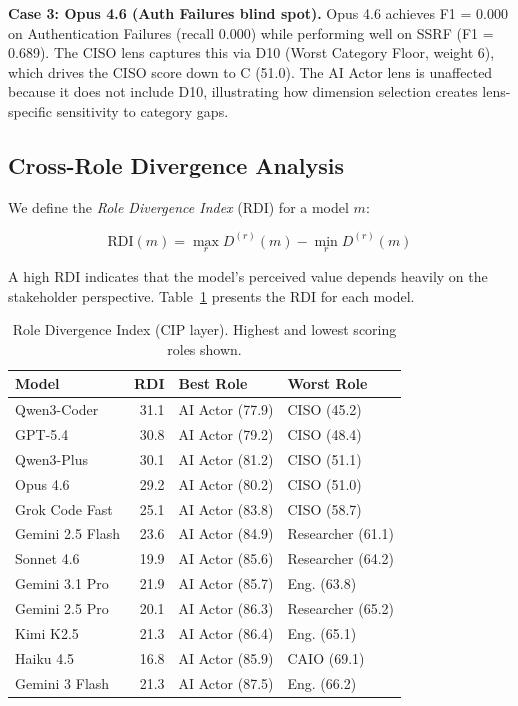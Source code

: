 \documentclass[10pt,twocolumn]{article}
\begin{document}
\textbf{Case 3: Opus 4.6 (Auth Failures blind spot).} Opus 4.6 achieves F1 = 0.000 on Authentication Failures (recall 0.000) while performing well on SSRF (F1 = 0.689). The CISO lens captures this via D10 (Worst Category Floor, weight 6), which drives the CISO score down to C (51.0). The AI Actor lens is unaffected because it does not include D10, illustrating how dimension selection creates lens-specific sensitivity to category gaps.

\subsection{Cross-Role Divergence Analysis}
\label{sec:divergence}

We define the \emph{Role Divergence Index} (RDI) for a model $m$:

\begin{equation}
\text{RDI}(m) = \max_{r} D^{(r)}(m) - \min_{r} D^{(r)}(m)
\label{eq:rdi}
\end{equation}

A high RDI indicates that the model's perceived value depends heavily on the stakeholder perspective. Table~\ref{tab:rdi} presents the RDI for each model.

\begin{table}[t]
\centering
\caption{Role Divergence Index (CIP layer). Highest and lowest scoring roles shown.}
\label{tab:rdi}
\small
\begin{tabular}{@{}l r l l@{}}
\toprule
\textbf{Model} & \textbf{RDI} & \textbf{Best Role} & \textbf{Worst Role} \\
\midrule
Qwen3-Coder      & 31.1 & AI Actor (77.9) & CISO (45.2) \\
GPT-5.4          & 30.8 & AI Actor (79.2) & CISO (48.4) \\
Qwen3-Plus       & 30.1 & AI Actor (81.2) & CISO (51.1) \\
Opus 4.6         & 29.2 & AI Actor (80.2) & CISO (51.0) \\
Grok Code Fast   & 25.1 & AI Actor (83.8) & CISO (58.7) \\
Gemini 2.5 Flash & 23.6 & AI Actor (84.9) & Researcher (61.1) \\
Sonnet 4.6       & 19.9 & AI Actor (85.6) & Researcher (64.2) \\
Gemini 3.1 Pro   & 21.9 & AI Actor (85.7) & Eng. (63.8) \\
Gemini 2.5 Pro   & 20.1 & AI Actor (86.3) & Researcher (65.2) \\
Kimi K2.5        & 21.3 & AI Actor (86.4) & Eng. (65.1) \\
Haiku 4.5        & 16.8 & AI Actor (85.9) & CAIO (69.1) \\
Gemini 3 Flash   & 21.3 & AI Actor (87.5) & Eng. (66.2) \\
\bottomrule
\end{tabular}
\end{table}
\end{document}
